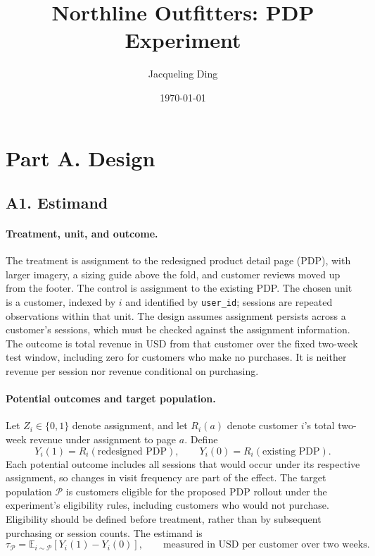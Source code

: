 \documentclass[11pt]{article}
\title{Northline Outfitters: PDP Experiment}
\author{Jacqueling Ding}
\date{\today}
\begin{document}
\maketitle

\section*{Part A. Design}
\subsection*{A1. Estimand}

\paragraph{Treatment, unit, and outcome.}
The treatment is assignment to the redesigned product detail page (PDP),
with larger imagery, a sizing guide above the fold, and customer reviews
moved up from the footer. The control is assignment to the existing PDP.
The chosen unit is a customer, indexed by $i$ and identified by
\texttt{user\_id}; sessions are repeated observations within that unit.
The design assumes assignment persists across a customer's sessions, which
must be checked against the assignment information. The outcome is total
revenue in USD from that customer over the fixed two-week test window,
including zero for customers who make no purchases. It is neither revenue
per session nor revenue conditional on purchasing.

\paragraph{Potential outcomes and target population.}
Let $Z_i\in\{0,1\}$ denote assignment, and let $R_i(a)$ denote customer
$i$'s total two-week revenue under assignment to page $a$. Define
\[
Y_i(1)=R_i(\text{redesigned PDP}),
\qquad
Y_i(0)=R_i(\text{existing PDP}).
\]
Each potential outcome includes all sessions that would occur under its
respective assignment, so changes in visit frequency are part of the effect.
The target population $\mathcal{P}$ is customers eligible for the proposed
PDP rollout under the experiment's eligibility rules, including customers
who would not purchase. Eligibility should be defined before treatment,
rather than by subsequent purchasing or session counts. The estimand is
\[
\tau_{\mathcal{P}}
=\mathbb{E}_{i\sim\mathcal{P}}\!\left[Y_i(1)-Y_i(0)\right],
\qquad \text{measured in USD per customer over two weeks.}
\]
\end{document}
